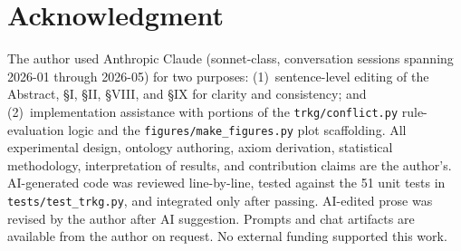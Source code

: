 \documentclass{ieeeaccess}
\begin{document}
\section*{Acknowledgment}

The author used Anthropic Claude (sonnet-class, conversation sessions spanning 2026-01 through 2026-05) for two purposes: (1)~sentence-level editing of the Abstract, §I, §II, §VIII, and §IX for clarity and consistency; and (2)~implementation assistance with portions of the \texttt{trkg/conflict.py} rule-evaluation logic and the \texttt{figures/make\_figures.py} plot scaffolding. All experimental design, ontology authoring, axiom derivation, statistical methodology, interpretation of results, and contribution claims are the author's. AI-generated code was reviewed line-by-line, tested against the 51 unit tests in \texttt{tests/test\_trkg.py}, and integrated only after passing. AI-edited prose was revised by the author after AI suggestion. Prompts and chat artifacts are available from the author on request. No external funding supported this work.
\end{document}

